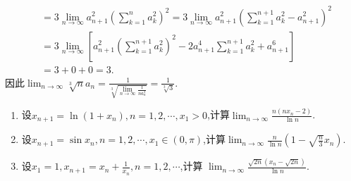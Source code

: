 \documentclass[../../main.tex]{subfiles}
\begin{document}
\begin{solution}
\begin{align*}
&=3\lim_{n\rightarrow\infty}a_{n + 1}^{2}\left(\sum\limits_{k = 1}^n{a_{k}^{2}}\right)^2=3\lim_{n\rightarrow\infty}a_{n + 1}^{2}\left(\sum\limits_{k = 1}^{n + 1}{a_{k}^{2}}-a_{n + 1}^{2}\right)^2\\
&=3\lim_{n\rightarrow\infty}\left[a_{n + 1}^{2}\left(\sum\limits_{k = 1}^{n + 1}{a_{k}^{2}}\right)^2 - 2a_{n + 1}^{4}\sum\limits_{k = 1}^{n + 1}{a_{k}^{2}}+a_{n + 1}^{6}\right]\\
&=3 + 0 + 0 = 3.
\end{align*}
因此\(\lim_{n\rightarrow\infty}\sqrt[3]{n}a_n=\frac{1}{\sqrt[3]{\lim\limits_{n\rightarrow\infty}\frac{1}{na_{n}^{3}}}}=\frac{1}{\sqrt[3]{3}}\).
\end{solution}

\begin{example}
\begin{enumerate}
\item 设\(x_{n + 1} = \ln(1 + x_n), n = 1, 2, \cdots, x_1 > 0\),计算\(\lim_{n \to \infty} \frac{n(nx_n - 2)}{\ln n}\).

\item 设\(x_{n + 1} = \sin x_n, n = 1, 2, \cdots, x_1 \in (0, \pi)\),计算\(\lim_{n \to \infty} \frac{n}{\ln n}(1 - \sqrt{\frac{n}{3}}x_n)\).

\item 设\(x_1 = 1, x_{n + 1} = x_n + \frac{1}{x_n}, n = 1, 2, \cdots\),计算
\(\lim_{n \to \infty} \frac{\sqrt{2n}(x_n - \sqrt{2n})}{\ln n}\).
\end{enumerate}
\end{example}
\end{document}
